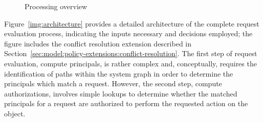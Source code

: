 \documentclass{article}
\begin{document}
\begin{figure}[!ht]\centering
    \caption{Processing overview}\label{img:overview}
\end{figure}

Figure~\ref{img:architecture} provides a detailed architecture of the complete request evaluation process, indicating the inputs necessary and decisions employed; the figure includes the conflict resolution extension described in Section~\ref{sec:model:policy-extensions:conflict-resolution}.
The first step of request evaluation, compute principals, is rather complex and, conceptually, requires the identification of paths within the system graph in order to determine the principals which match a request.
However, the second step, compute authorizations, involves simple lookups to determine whether the matched principals for a request are authorized to perform the requested action on the object.
\end{document}
